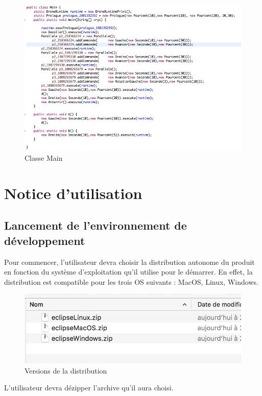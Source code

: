 \documentclass[12pt]{article}
\begin{document}
        \begin{figure}[!h]
        \centering
        \includegraphics[scale=0.50]{ClasseGen.png}
        \caption{Classe Main}
        \end{figure}
    
    \newpage
    \section{Notice d'utilisation}
    \subsection{Lancement de l'environnement de développement}
        Pour commencer, l'utilisateur devra choisir la distribution autonome du produit en fonction du système d'exploitation qu'il utilise pour le démarrer.
        En effet, la distribution est compatible pour les trois OS suivants : MacOS, Linux, Windows.
        
        \begin{figure}[!h]
        \centering
        \includegraphics[scale=0.75]{01.png}
        \caption{Versions de la distribution}
        \end{figure}
        
        \newpage
        L'utilisateur devra dézipper l'archive qu'il aura choisi.
        
\end{document}
